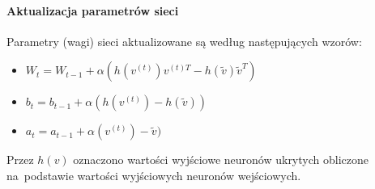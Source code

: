 \paragraph{Aktualizacja parametrów sieci}
Parametry (wagi) sieci aktualizowane są według następujących wzorów:
\begin{itemize}
  \item $W_t=W_{t-1}+\alpha(h(v^{(t)})v^{(t)T}-h(\tilde{v})\tilde{v}^{T})$
  \item $b_t=b_{t-1}+\alpha(h(v^{(t)})-h(\tilde{v}))$
  \item $a_t=a_{t-1}+\alpha(v^{(t)})-\tilde{v})$
\end{itemize}
\vspace{1cm}

Przez $h(v)$ oznaczono wartości wyjściowe neuronów ukrytych obliczone na~podstawie wartości wyjściowych
neuronów wejściowych.
